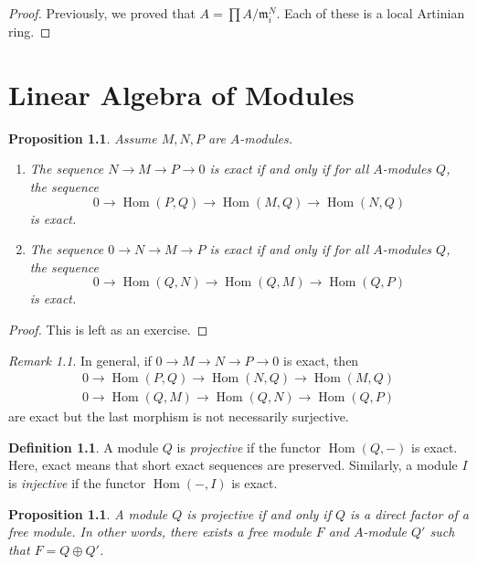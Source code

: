 \documentclass[leqno, openany]{memoir}
\newtheorem{prop}[thm]{Proposition}
\theoremstyle{definition}
\newtheorem{defn}[thm]{Definition}
\theoremstyle{remark}
\newtheorem{rmk}[thm]{Remark}
\theoremstyle{plain}
\theoremstyle{definition}
\theoremstyle{remark}
\newcommand{\mf}[1]{\mathfrak{#1}}
\DeclareMathOperator{\Hom}{Hom}
\begin{document}
\begin{proof} Previously, we proved that $A = \prod A / \mf{m}_i^N$. Each of
these is a local Artinian ring.  \end{proof}

\chapter{Linear Algebra of Modules}%

\begin{prop} Assume $M, N, P$ are $A$-modules.  \begin{enumerate} \item The
    sequence $N \to M \to P \to 0$ is exact if and only if for all $A$-modules
    $Q$, the sequence \[ 0 \to \Hom(P,Q) \to \Hom(M,Q) \to \Hom(N,Q) \] is
    exact.  \item The sequence $0 \to N \to M \to P $ is exact if and only if
    for all $A$-modules $Q$, the sequence \[ 0 \to \Hom(Q,N) \to \Hom(Q,M) \to
\Hom(Q,P) \] is exact.  \end{enumerate} \end{prop}

\begin{proof} This is left as an exercise.  \end{proof}

\begin{rmk} In general, if $0 \to M \to N \to P \to 0$ is exact, then
    \begin{align*} 0 \to \Hom(P,Q) \to \Hom(N,Q) \to \Hom(M,Q) \\ 0 \to
    \Hom(Q,M) \to \Hom(Q,N) \to \Hom(Q,P) \end{align*} are exact but the last
    morphism is not necessarily surjective.  \end{rmk}

\begin{defn} A module $Q$ is \textit{projective} if the functor $\Hom(Q,-)$ is
exact. Here, exact means that short exact sequences are preserved. Similarly, a
module $I$ is \textit{injective} if the functor $\Hom(-,I)$ is exact.
\end{defn}

\begin{prop} A module $Q$ is projective if and only if $Q$ is a direct factor
of a free module. In other words, there exists a free module $F$ and $A$-module
$Q'$ such that $F = Q \oplus Q'$.  \end{prop}
\end{document}
